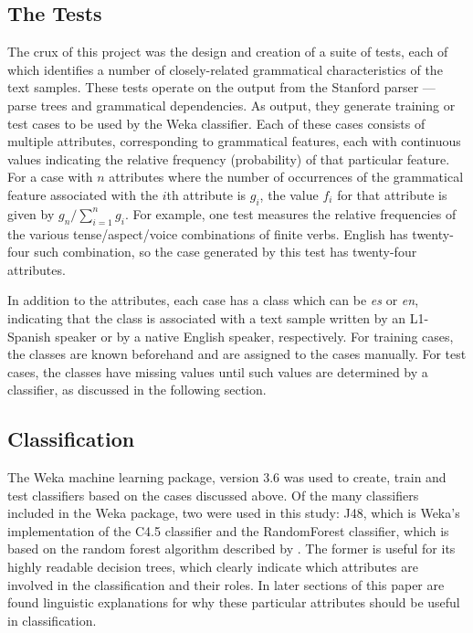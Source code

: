 \documentclass[main.tex]{subfiles}
\begin{document}
\subsection{The Tests}
The crux of this project was the design and creation of a suite of tests, each of which identifies a number of closely-related grammatical characteristics of the text samples. These tests operate on the output from the Stanford parser --- parse trees and grammatical dependencies. As output, they generate training or test cases to be used by the Weka classifier. Each of these cases consists of multiple attributes, corresponding to grammatical features, each with continuous values indicating the relative frequency (probability) of that particular feature. For a case with $n$ attributes where the number of occurrences of the grammatical feature associated with the $i$th attribute is $g_i$, the value $f_i$ for that attribute is given by $g_n  / \displaystyle\sum\limits_{i=1}^n g_i$. For example, one test measures the relative frequencies of the various tense/aspect/voice combinations of finite verbs. English has twenty-four such combination, so the case generated by this test has twenty-four attributes.

In addition to the attributes, each case has a class which can be \textit{es} or \textit{en}, indicating that the class is associated with a text sample written by an L1-Spanish speaker or by a native English speaker, respectively. For training cases, the classes are known beforehand and are assigned to the cases manually. For test cases, the classes have missing values until such values are determined by a classifier, as discussed in the following section.

\subsection{Classification}

The Weka machine learning package, version 3.6 \citep{hall-et-al:2009} was used to create, train and test classifiers based on the cases discussed above. Of the many classifiers included in the Weka package, two were used in this study: J48, which is Weka's implementation of the C4.5 classifier \citep{quinlan:1993} and the RandomForest classifier, which is based on the random forest algorithm described by \citet{breiman:2001}. The former is useful for its highly readable decision trees, which clearly indicate which attributes are involved in the classification and their roles. In later sections of this paper are found linguistic explanations for why these particular attributes should be useful in classification.
 
\end{document}
